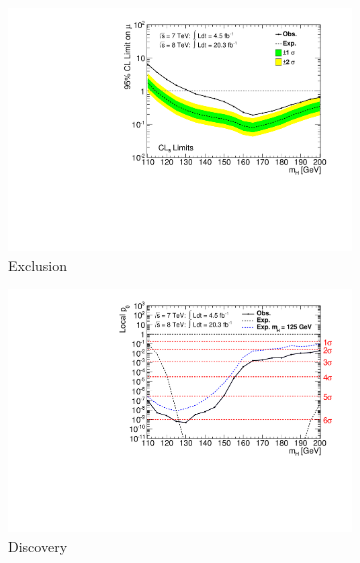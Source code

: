 \begin{figure}[p]
	\begin{subfigure}[b]{0.495\textwidth}
		\centering
		\includegraphics[width=\textwidth,clip=true,trim=0.6cm 0.8cm 1.0cm 0.4cm]{custom_images/limits/cls_combined}
		\caption{Exclusion}
		\label{fig:comb_results:CLs}
	\end{subfigure}
	\hfill
	\begin{subfigure}[b]{0.495\textwidth}
		\centering
		\includegraphics[width=\textwidth,clip=true,trim=0.6cm 0.8cm 1.0cm 0.4cm]{custom_images/limits/p0_combined}
		\caption{Discovery}
		\label{fig:comb_results:p0}
	\end{subfigure}
	\\[12pt]
	\begin{subfigure}[b]{0.495\textwidth}
		\centering

\end{subfigure}
\end{figure}
